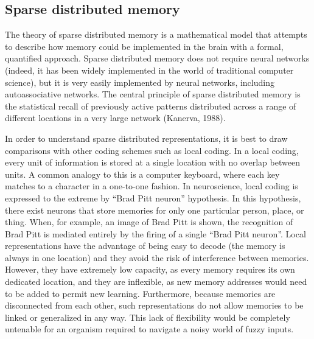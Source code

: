 \documentclass[12pt,a4paper,]{report}
\begin{document}
\subsection{Sparse distributed memory}\label{sparse-distributed-memory}

The theory of sparse distributed memory is a mathematical model that
attempts to describe how memory could be implemented in the brain with a
formal, quantified approach. Sparse distributed memory does not require
neural networks (indeed, it has been widely implemented in the world of
traditional computer science), but it is very easily implemented by
neural networks, including autoassociative networks. The central
principle of sparse distributed memory is the statistical recall of
previously active patterns distributed across a range of different
locations in a very large network (Kanerva, 1988).

In order to understand sparse distributed representations, it is best to
draw comparisons with other coding schemes such as local coding. In a
local coding, every unit of information is stored at a single location
with no overlap between units. A common analogy to this is a computer
keyboard, where each key matches to a character in a one-to-one fashion.
In neuroscience, local coding is expressed to the extreme by ``Brad Pitt
neuron'' hypothesis. In this hypothesis, there exist neurons that store
memories for only one particular person, place, or thing. When, for
example, an image of Brad Pitt is shown, the recognition of Brad Pitt is
mediated entirely by the firing of a single ``Brad Pitt neuron''. Local
representations have the advantage of being easy to decode (the memory
is always in one location) and they avoid the risk of interference
between memories. However, they have extremely low capacity, as every
memory requires its own dedicated location, and they are inflexible, as
new memory addresses would need to be added to permit new learning.
Furthermore, because memories are disconnected from each other, such
representations do not allow memories to be linked or generalized in any
way. This lack of flexibility would be completely untenable for an
organism required to navigate a noisy world of fuzzy inputs.
\end{document}
